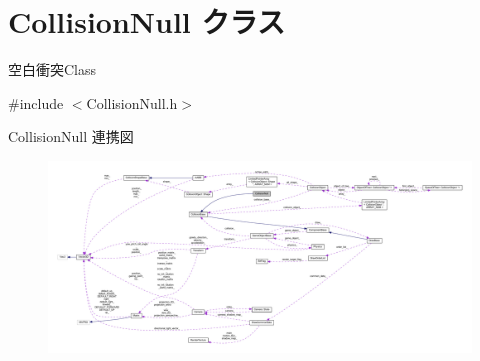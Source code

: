 \hypertarget{class_collision_null}{}\section{Collision\+Null クラス}
\label{class_collision_null}


空白衝突\+Class  




{\ttfamily \#include $<$Collision\+Null.\+h$>$}



Collision\+Null 連携図\nopagebreak
\begin{figure}[H]
\begin{center}
\leavevmode
\includegraphics[width=350pt]{class_collision_null__coll__graph}
\end{center}
\end{figure}
